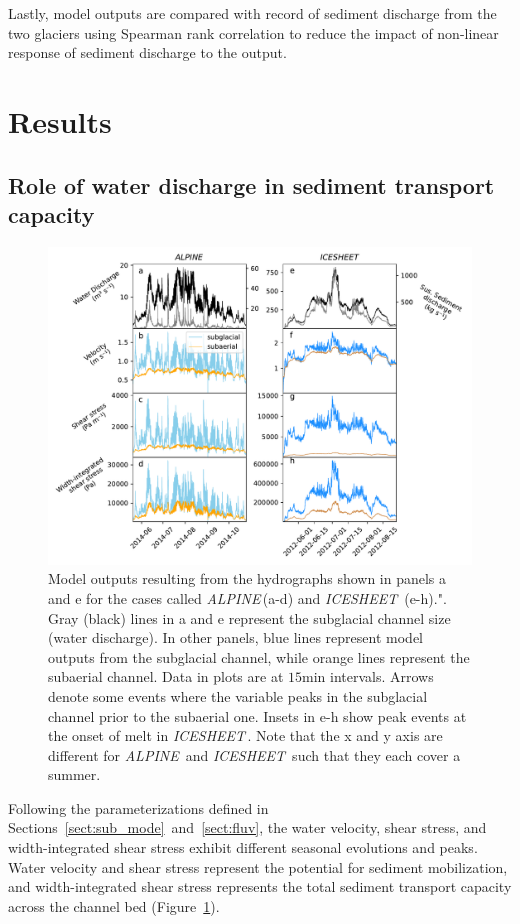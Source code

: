 \documentclass[11pt]{article}
\newcommand{\alpine}{\textit{ALPINE}\,}
\newcommand{\icesheet}{\textit{ICESHEET}\,}
\newcommand{\unit}[1]{$\mathrm{#1}$}
\begin{document}
Lastly, model outputs are compared with record of sediment discharge from the two glaciers using Spearman rank correlation to reduce the impact of non-linear response of sediment discharge to the output.

\section{Results}

\subsection{Role of water discharge in sediment transport capacity}
\begin{figure}[h]
  \centering
  \includegraphics[width=0.8\linewidth]{Fig2.pdf}
  \caption{Model outputs resulting from the hydrographs shown in panels a and e for the cases called \alpine (a-d) and \icesheet{} (e-h).". Gray (black) lines in a and e represent the subglacial channel size (water discharge).  In other panels, blue lines represent model outputs from the subglacial channel, while orange lines represent the subaerial channel.
    Data in plots are at $15$\unit{min} intervals.
    Arrows denote some events where the variable peaks in the subglacial channel prior to the subaerial one.
    Insets in e-h show peak events at the onset of melt in \icesheet{}.
    Note that the x and y axis are different for \alpine{} and \icesheet{} such that they each cover a summer.} 
  \label{fig:model_outs}
\end{figure}
Following the parameterizations defined in Sections~\ref{sect:sub_mode}~and~\ref{sect:fluv}, the water velocity, shear stress, and width-integrated shear stress exhibit different seasonal evolutions and peaks. Water velocity and shear stress represent the potential for sediment mobilization, and width-integrated shear stress represents the total sediment transport capacity across the channel bed (Figure~\ref{fig:model_outs}).
\end{document}
